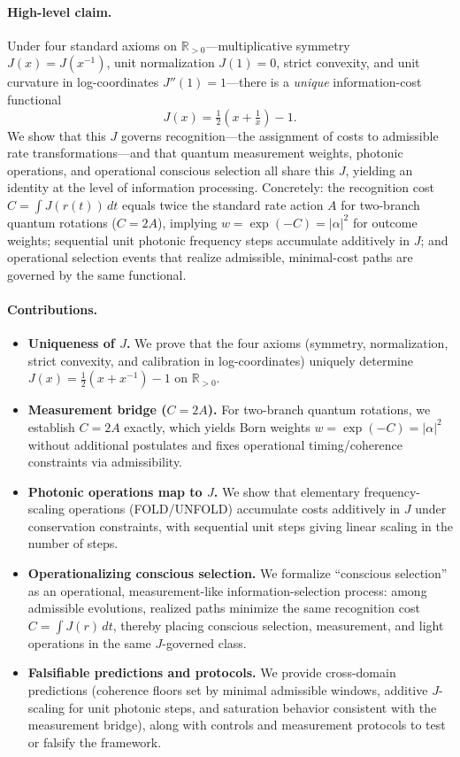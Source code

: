 \documentclass[12pt,a4paper]{article}
\begin{document}
\paragraph{High-level claim.}
Under four standard axioms on $\mathbb{R}_{>0}$—multiplicative symmetry $J(x)=J(x^{-1})$, unit normalization $J(1)=0$, strict convexity, and unit curvature in log-coordinates $J''(1)=1$—there is a \emph{unique} information-cost functional
\[
  J(x)=\tfrac{1}{2}\!\left(x+\tfrac{1}{x}\right)-1.
\]
We show that this $J$ governs recognition—the assignment of costs to admissible rate transformations—and that quantum measurement weights, photonic operations, and operational conscious selection all share this $J$, yielding an identity at the level of information processing. Concretely: the recognition cost $C=\int J(r(t))\,dt$ equals twice the standard rate action $A$ for two-branch quantum rotations ($C=2A$), implying $w=\exp(-C)=|{\alpha}|^{2}$ for outcome weights; sequential unit photonic frequency steps accumulate additively in $J$; and operational selection events that realize admissible, minimal-cost paths are governed by the same functional.

\paragraph{Contributions.}
\begin{itemize}
  \item \textbf{Uniqueness of $J$.} We prove that the four axioms (symmetry, normalization, strict convexity, and calibration in log-coordinates) uniquely determine $J(x)=\tfrac{1}{2}(x+x^{-1})-1$ on $\mathbb{R}_{>0}$.
  \item \textbf{Measurement bridge ($C=2A$).} For two-branch quantum rotations, we establish $C=2A$ exactly, which yields Born weights $w=\exp(-C)=|{\alpha}|^{2}$ without additional postulates and fixes operational timing/coherence constraints via admissibility.
  \item \textbf{Photonic operations map to $J$.} We show that elementary frequency-scaling operations (FOLD/UNFOLD) accumulate costs additively in $J$ under conservation constraints, with sequential unit steps giving linear scaling in the number of steps.
  \item \textbf{Operationalizing conscious selection.} We formalize “conscious selection” as an operational, measurement-like information-selection process: among admissible evolutions, realized paths minimize the same recognition cost $C=\int J(r)\,dt$, thereby placing conscious selection, measurement, and light operations in the same $J$-governed class.
  \item \textbf{Falsifiable predictions and protocols.} We provide cross-domain predictions (coherence floors set by minimal admissible windows, additive $J$-scaling for unit photonic steps, and saturation behavior consistent with the measurement bridge), along with controls and measurement protocols to test or falsify the framework.
\end{itemize}
\end{document}
